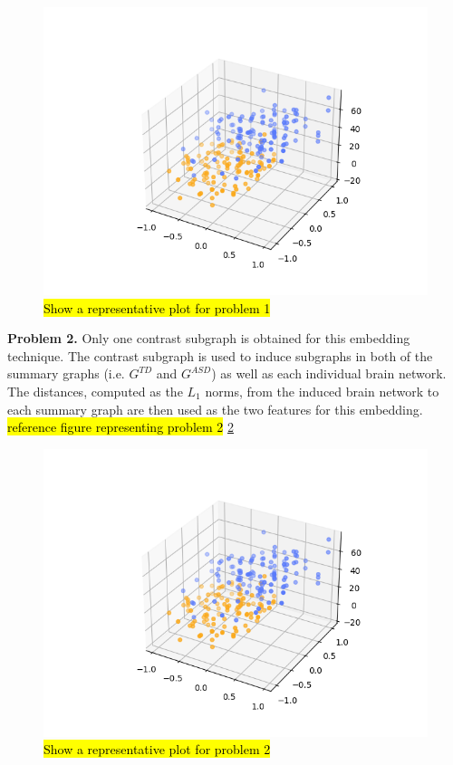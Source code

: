 \documentclass[sigconf]{acmart}
\begin{document}
\begin{figure}
    \centering
    \includegraphics[width=\columnwidth, keepaspectratio=true]{test.png}
    \caption{\hl{Show a representative plot for problem 1}}
    \label{fig:prob1}
\end{figure}

\textbf{Problem 2.}
Only one contrast subgraph is obtained for this embedding technique.
The contrast subgraph is used to induce subgraphs in both of the summary graphs (i.e. $G^{TD}$ and $G^{ASD}$) as well as each individual brain network.
The distances, computed as the $L_1$ norms, from the induced brain network to each summary graph are then used as the two features for this embedding.
\hl{reference figure representing problem 2} \ref{fig:prob2}

\begin{figure}
    \centering
    \includegraphics[width=\columnwidth, keepaspectratio=true]{test.png}
    \caption{\hl{Show a representative plot for problem 2}}
    \label{fig:prob2}
\end{figure}
\end{document}
